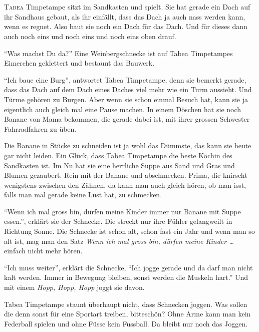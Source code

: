 \chapter*{}
\lettrine[lines=3]{\color{red}T}{abea} Timpetampe sitzt im Sandkasten und spielt. Sie hat gerade ein Dach auf ihr Sandhaus gebaut, als ihr einfällt, dass das Dach ja auch nass werden kann, wenn es regnet. Also baut sie noch ein Dach für das Dach. Und für dieses dann auch noch eins und noch eins und noch eins oben drauf.

\enquote{Was machst Du da?} Eine Weinbergschnecke ist auf Tabea Timpetampes Eimerchen geklettert und bestaunt das Bauwerk. 

\enquote{Ich baue eine Burg}, antwortet Tabea Timpetampe, denn sie bemerkt gerade, dass das Dach auf dem Dach eines Daches viel mehr wie ein Turm aussieht. Und Türme gehören zu Burgen. Aber wenn sie schon einmal Besuch hat, kann sie ja eigentlich auch gleich mal eine Pause machen. In einem Döschen hat sie noch Banane von Mama bekommen, die gerade dabei ist, mit ihrer grossen Schwester Fahrradfahren zu üben. 

Die Banane in Stücke zu schneiden ist ja wohl das Dümmste, das kann sie heute gar nicht leiden. Ein Glück, dass Tabea Timpetampe die beste Köchin des Sandkasten ist. Im Nu hat sie eine herrliche Suppe aus Sand und Gras und Blumen gezaubert. Rein mit der Banane und abschmecken. Prima, die knirscht wenigstens zwischen den Zähnen, da kann man auch gleich hören, ob man isst, falls man mal gerade keine Lust hat, zu schmecken.

\enquote{Wenn ich mal gross bin, dürfen meine Kinder immer nur Banane mit Suppe essen.}, erklärt sie der Schnecke. Die streckt nur ihre Fühler gelangweilt in Richtung Sonne. Die Schnecke ist schon alt, schon fast ein Jahr und wenn man so alt ist, mag man den Satz \textit{Wenn ich mal gross bin, dürfen meine Kinder \dots} einfach nicht mehr hören.

\enquote{Ich muss weiter}, erklärt die Schnecke, \enquote{Ich jogge gerade und da darf man nicht kalt werden. Immer in Bewegung bleiben, sonst werden die Muskeln hart.} Und mit einem \textit{Hopp, Hopp, Hopp} joggt sie  davon.

Tabea Timpetampe staunt überhaupt nicht, dass Schnecken joggen. Was sollen die denn sonst für eine Sportart treiben, bitteschön? Ohne Arme kann man kein Federball spielen und ohne Füsse kein Fussball. Da bleibt nur noch das Joggen. 

